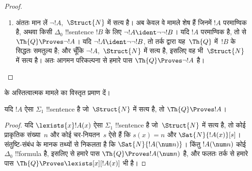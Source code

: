 \documentclass[../../../include/open-logic-section]{subfiles}
\begin{document}
\begin{proof}
\begin{enumerate}
सत्य है, जहाँ $t$ कोई बंद पद है। यह !!{sentence},~$\Th{Q}$ में
$\bforall{x<t}{\lnot!A(x)}$ के समतुल्य है, इसलिए हम परिबद्ध सार्विक
परिमाणकों वाला तर्क लागू कर सकते हैं।
%
\item अंततः मान लें $\lnot !A$,~$\Struct{N}$ में सत्य है। अब केवल वे
मामले शेष हैं जिनमें $!A$ परमाण्विक है, अथवा किसी $\Delta_0$
!!{sentence} $!B$ के लिए $\lnot !A \ident \lnot\lnot !B$। यदि $!A$
परमाण्विक है, तो  से
$\Th{Q} \Proves \lnot !A$। यदि
$\lnot !A \ident \lnot\lnot !B$, तो तर्क द्वारा यह~$\Th{Q}$ में~$!B$ के
सिद्धतः समतुल्य है; और चूँकि $\lnot !A$,~$\Struct{N}$ में सत्य है, इसलिए
वह भी~$\Struct{N}$ में सत्य है। अतः आगमन परिकल्पना से हमारे पास
$\Th{Q} \Proves \lnot !A$ है।
\end{enumerate}
\end{proof}

\begin{prob}
 के अस्तित्वात्मक मामले का विस्तृत प्रमाण
दें।
\end{prob}

\begin{thm}
यदि $!A$ ऐसा $\Sigma_1$ !!{sentence} है जो~$\Struct{N}$ में सत्य है, तो
$\Th{Q} \Proves !A$।
\end{thm}

\begin{proof}
यदि $\lexists{x}!A(x)$ ऐसा $\Sigma_1$ !!{sentence} है जो~$\Struct{N}$ में
सत्य है, तो कोई प्राकृतिक संख्या~$n$ और कोई चर-नियतन~$s$ ऐसे हैं कि
$s(x) = n$ और $\Sat{N}{!A(x)}[s]$। संतुष्टि-संबंध के मानक तथ्यों से निकलता
है कि $\Sat{N}{!A(\num n)}$। किंतु $!A(\num n)$ कोई $\Delta_0$
!!{formula} है, इसलिए  से हमारे पास
$\Th{Q} \Proves !A(\num n)$ है, और फलतः तर्क से हमारे पास
$\Th{Q} \Proves \lexists[x][!A(x)]$ भी है।
\end{proof}
\end{document}
